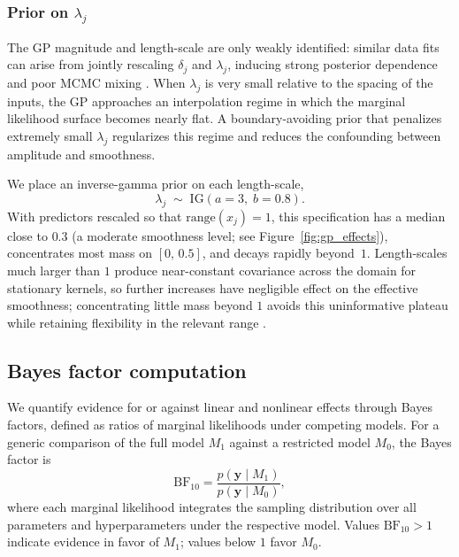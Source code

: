 \documentclass{article}
\begin{document}
\subsubsection{Prior on \texorpdfstring{$\lambda_j$}{lambda j}\label{subsubsec:prior-lambda}}

The GP magnitude and length-scale are only weakly identified: similar
data fits can arise from jointly rescaling $\delta_j$ and
$\lambda_j$, inducing strong posterior dependence and poor
MCMC mixing \parencite{paciorek2003}.
When $\lambda_j$ is very small relative to the spacing of the
inputs, the GP approaches an interpolation regime in which the
marginal likelihood surface becomes nearly flat.
A boundary-avoiding prior that penalizes extremely small
$\lambda_j$ regularizes this regime and reduces the confounding
between amplitude and smoothness.

We place an inverse-gamma prior on each length-scale,
%
\begin{equation}
\label{eq:prior-lambda}
\lambda_j \;\sim\; \mathrm{IG}(a=3,\; b=0.8).
\end{equation}
%
With predictors rescaled so that $\mathrm{range}(x_j)=1$,
this specification has a median close to $0.3$ (a moderate smoothness
level; see Figure~\ref{fig:gp_effects}), concentrates most mass on
$[0,\,0.5]$, and decays rapidly beyond~$1$.
Length-scales much larger than $1$ produce near-constant covariance
across the domain for stationary kernels, so further increases have
negligible effect on the effective smoothness; concentrating little
mass beyond $1$ avoids this uninformative plateau while retaining
flexibility in the relevant range \parencite{Stan}.


\subsection{Bayes factor computation\label{subsec:bf-computation}}

We quantify evidence for or against linear and nonlinear effects
through Bayes factors, defined as ratios of marginal likelihoods
under competing models.
For a generic comparison of the full model $M_1$ against a restricted
model $M_0$, the Bayes factor is
%
\begin{equation}
\label{eq:bf-def}
\mathrm{BF}_{10}
  = \frac{p(\mathbf{y}\mid M_1)}{p(\mathbf{y}\mid M_0)},
\end{equation}
%
where each marginal likelihood integrates the sampling distribution
over all parameters and hyperparameters under the respective model.
Values $\mathrm{BF}_{10}>1$ indicate evidence in favor of $M_1$;
values below $1$ favor $M_0$.
\end{document}

